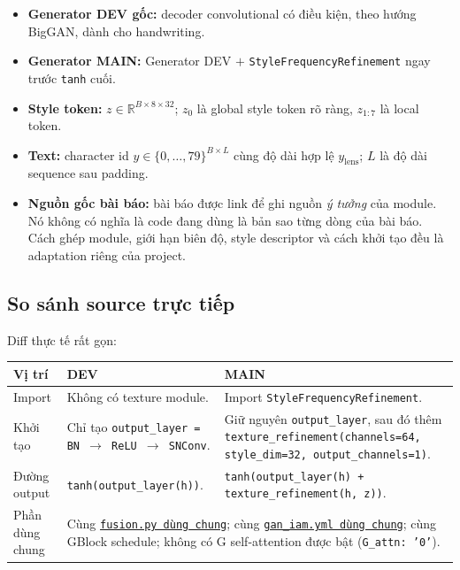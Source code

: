 \documentclass[10pt,a4paper]{article}
\newcommand{\dev}{\textcolor{blue!65!black}{\textbf{DEV}}}
\newcommand{\mainbranch}{\textcolor{orange!55!black}{\textbf{MAIN}}}
\newcommand{\code}[2]{\href{#1}{\texttt{#2}}}
\newcommand{\srcfusion}{\code{https://github.com/rquq/HGGAN_test/blob/dev/networks/fusion.py}{fusion.py dùng chung}}
\newcommand{\srccfg}{\code{https://github.com/rquq/HGGAN_test/blob/dev/configs/gan_iam.yml}{gan\_iam.yml dùng chung}}
\begin{document}
\begin{itemize}[leftmargin=1.45em,itemsep=2pt]
  \item \textbf{Generator DEV gốc:} decoder convolutional có điều kiện, theo hướng BigGAN, dành cho handwriting.
  \item \textbf{Generator MAIN:} Generator DEV $+$ \texttt{StyleFrequencyRefinement} ngay trước \texttt{tanh} cuối.
  \item \textbf{Style token:} $z\in\mathbb{R}^{B\times8\times32}$; $z_0$ là global style token rõ ràng, $z_{1:7}$ là local token.
  \item \textbf{Text:} character id $y\in\{0,\ldots,79\}^{B\times L}$ cùng độ dài hợp lệ $y_{\mathrm{lens}}$; $L$ là độ dài sequence sau padding.
  \item \textbf{Nguồn gốc bài báo:} bài báo được link để ghi nguồn \emph{ý tưởng} của module. Nó không có nghĩa là code đang dùng là bản sao từng dòng của bài báo. Cách ghép module, giới hạn biên độ, style descriptor và cách khởi tạo đều là adaptation riêng của project.
\end{itemize}

\subsection*{So sánh source trực tiếp}

Diff thực tế rất gọn:

\begin{center}
\small
\begin{tabularx}{\textwidth}{@{}p{}X p{}@{}}
\toprule
Vị trí & \dev{} & \mainbranch{} \\
\midrule
Import & Không có texture module. & Import \texttt{StyleFrequencyRefinement}. \\
Khởi tạo & Chỉ tạo \texttt{output\_layer = BN $\rightarrow$ ReLU $\rightarrow$ SNConv}. & Giữ nguyên \texttt{output\_layer}, sau đó thêm \texttt{texture\_refinement(channels=64, style\_dim=32, output\_channels=1)}. \\
Đường output & \texttt{tanh(output\_layer(h))}. & \texttt{tanh(output\_layer(h) + texture\_refinement(h, z))}. \\
Phần dùng chung & \multicolumn{2}{l}{Cùng \srcfusion{}; cùng \srccfg{}; cùng GBlock schedule; không có G self-attention được bật (\texttt{G\_attn: '0'}).} \\
\bottomrule
\end{tabularx}
\end{center}
\end{document}
